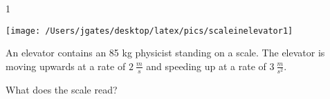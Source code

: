 
\AddToShipoutPicture*{\BackgroundPic}

\addtocounter {ProbNum} {1}

\begin{floatingfigure}[r]{.2\textwidth}
\texttt{[image: /Users/jgates/desktop/latex/pics/scaleinelevator1]}
\end{floatingfigure}
 
{\bf \Large{}} An elevator contains an 85 kg physicist standing on a scale. The elevator is moving upwards at a rate of ${2~\tfrac{m}{s}}$ and speeding up at a rate of ${3~\tfrac{m}{s^2}}$.

\bigskip
What does the scale read?




\vfill
\newpage
